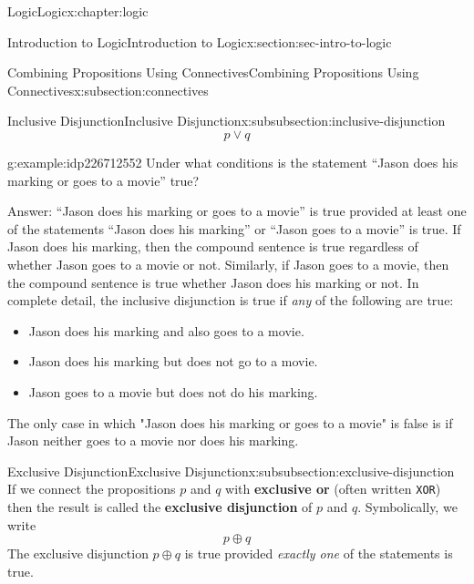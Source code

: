 \documentclass[twoside,10pt,]{book}
\newcommand{\mono}[1]{\texttt{#1}}
\newcommand{\terminology}[1]{\textbf{#1}}
\numberwithin{equation}{section}
\begin{document}
\begin{chapterptx}{Logic}{}{Logic}{}{}{x:chapter:logic}
\begin{sectionptx}{Introduction to Logic}{}{Introduction to Logic}{}{}{x:section:sec-intro-to-logic}
\begin{subsectionptx}{Combining Propositions Using Connectives}{}{Combining Propositions Using Connectives}{}{}{x:subsection:connectives}
\begin{subsubsectionptx}{Inclusive Disjunction}{}{Inclusive Disjunction}{}{}{x:subsubsection:inclusive-disjunction}
\begin{equation*}
p {\vee} q
\end{equation*}
%
\begin{example}{}{g:example:idp226712552}%
Under what conditions is the statement ``Jason does his marking or goes to a movie'' true?%
\par
Answer: ``Jason does his marking or goes to a movie'' is true provided at least one of the statements ``Jason does his marking'' or ``Jason goes to a movie'' is true.  If Jason does his marking, then the compound sentence is true regardless of whether Jason goes to a movie or not.  Similarly, if Jason goes to a movie, then the compound sentence is true whether Jason does his marking or not.  In complete detail, the inclusive disjunction is true if \emph{any} of the following are true:%
\begin{itemize}[label=\textbullet]
\item{}Jason does his marking and also goes to a movie.%
\item{}Jason does his marking but does not go to a movie.%
\item{}Jason goes to a movie but does not do his marking.%
\end{itemize}
The only case in which "Jason does his marking or goes to a movie" is false is if Jason neither goes to a movie nor does his marking.%
\end{example}
\end{subsubsectionptx}
%
%
\typeout{************************************************}
\typeout{************************************************}
%
\begin{subsubsectionptx}{Exclusive Disjunction}{}{Exclusive Disjunction}{}{}{x:subsubsection:exclusive-disjunction}
If we connect the propositions \(p\) and \(q\) with \terminology{exclusive or} (often written \mono{XOR}) then the result is called the \terminology{exclusive disjunction} of \(p\) and \(q\).  Symbolically, we write%
\begin{equation*}
p{\oplus} q
\end{equation*}
The exclusive disjunction \(p{\oplus} q\) is true provided \emph{exactly one} of the statements is true.%
\end{subsubsectionptx}
%
%
\typeout{************************************************}
\typeout{************************************************}

\end{subsectionptx}
\end{sectionptx}
\end{chapterptx}
\end{document}
